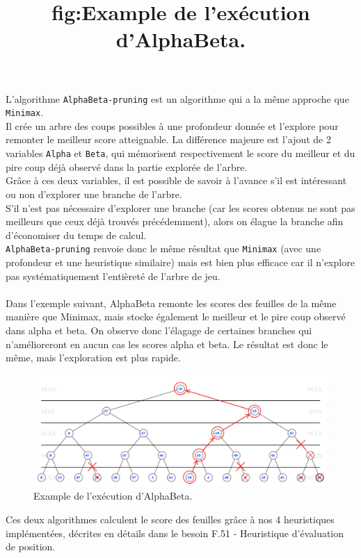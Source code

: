 \documentclass[a4paper,12pt]{article}
\begin{document}
L’algorithme \texttt{AlphaBeta-pruning} est un algorithme qui a la même
approche que \texttt{Minimax}.\\ Il crée un arbre des coups possibles à une
profondeur donnée et l’explore pour remonter le meilleur score atteignable. La
différence majeure est l’ajout de 2 variables \texttt{Alpha} et \texttt{Beta},
qui mémorisent respectivement le score du meilleur et du pire coup déjà observé
dans la partie explorée de l’arbre.\\ Grâce à ces deux variables, il est
possible de savoir à l’avance s’il est intéressant ou non d’explorer une
branche de l’arbre.\\ S’il n’est pas nécessaire d’explorer une branche (car les
scores obtenus ne sont pas meilleurs que ceux déjà trouvés précédemment), alors
on élague la branche afin d’économiser du temps de calcul.\\
\texttt{AlphaBeta-pruning} renvoie donc le même résultat que \texttt{Minimax}
(avec une profondeur et une heuristique similaire) mais est bien plus efficace
car il n’explore pas systématiquement l’entièreté de l’arbre de jeu.\\ \\ Dans
l'exemple suivant, AlphaBeta remonte les scores des feuilles de la même manière
que Minimax, mais stocke également le meilleur et le pire coup observé dans
alpha et beta. On observe donc l'élagage de certaines branches qui
n'amélioreront en aucun cas les scores alpha et beta. Le résultat est donc le
même, mais l'exploration est plus rapide.

\begin{figure}[h]
    \centering
    \includegraphics[width=1\textwidth]{images/alphabeta_example.png}
    \caption{Example de l'exécution d'AlphaBeta.}
    \title{fig:Example de l'exécution d'AlphaBeta.}
\end{figure}

Ces deux algorithmes calculent le score des feuilles grâce à nos 4 heuristiques
implémentées, décrites en détails dans le besoin F.51 - Heuristique
d’évaluation de position.\cite{HeuristicPaper}
\end{document}
